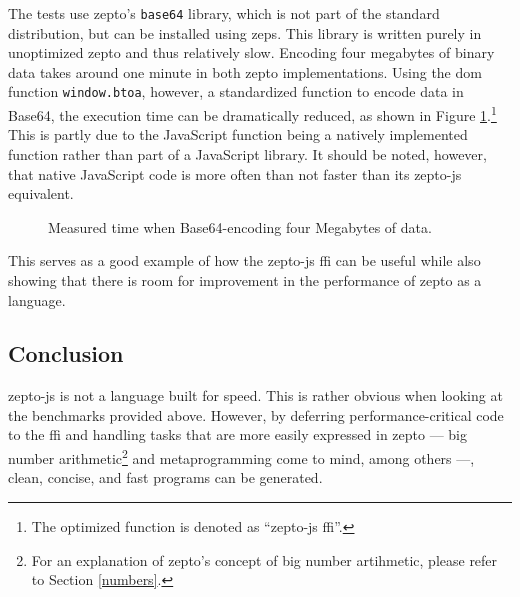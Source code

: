 \documentclass[oneside,11pt,xetex]{scrbook}
\begin{document}
The tests use zepto's \texttt{base64} library, which is not part of the
standard distribution, but can be installed using \gls{zeps}. This library
is written purely in unoptimized zepto and thus relatively slow. Encoding four
megabytes of binary data takes around one minute in both zepto implementations.
Using the \gls{dom} function \texttt{window.btoa}, however, a standardized function
to encode data in Base64, the execution time  can be dramatically reduced, as shown
in Figure \ref{fig:base64}.\footnote{The optimized function is denoted as
``zepto-js \gls{ffi}''.} This is partly due to the JavaScript function being a
natively implemented function rather than part of a JavaScript library. It should
be noted, however, that native JavaScript code is more often than not faster
than its zepto-js equivalent.

\begin{figure}
\centering
  \caption{Measured time when Base64-encoding four Megabytes of data.}
  \label{fig:base64}
\end{figure}

This serves as a good example of how the zepto-js \gls{ffi} can be useful while
also showing that there is room for improvement in the performance of zepto as
a language.

\subsection{Conclusion}

zepto-js is not a language built for speed. This is rather obvious when looking
at the benchmarks provided above. However, by deferring performance-critical code
to the \gls{ffi} and handling tasks that are more easily expressed in zepto ---
big number arithmetic\footnote{For an explanation of zepto's concept of big number
artihmetic, please refer to Section \ref{numbers}.} and metaprogramming come to
mind, among others ---, clean, concise, and fast programs can be generated.
\end{document}
